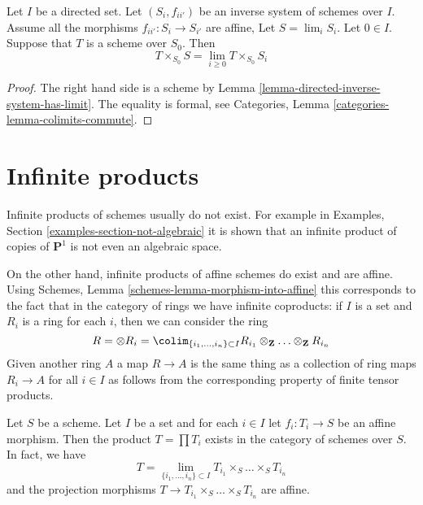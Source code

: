 \begin{lemma}
\label{lemma-scheme-over-limit}
Let $I$ be a directed set.
Let $(S_i, f_{ii'})$ be an inverse system of schemes over $I$.
Assume all the morphisms $f_{ii'} : S_i \to S_{i'}$ are affine,
Let $S = \lim_i S_i$. Let $0 \in I$.
Suppose that $T$ is a scheme over $S_0$.
Then
$$
T \times_{S_0} S = \lim_{i \geq 0} T \times_{S_0} S_i
$$
\end{lemma}

\begin{proof}
The right hand side is a scheme by
Lemma \ref{lemma-directed-inverse-system-has-limit}.
The equality is formal, see
Categories, Lemma \ref{categories-lemma-colimits-commute}.
\end{proof}



\section{Infinite products}
\label{section-inifinite-products}

\noindent
Infinite products of schemes usually do not exist. For example in
Examples, Section \ref{examples-section-not-algebraic}
it is shown that an infinite product of
copies of $\mathbf{P}^1$ is not even an algebraic space.

\medskip\noindent
On the other hand, infinite products of affine schemes do exist
and are affine. Using Schemes, Lemma \ref{schemes-lemma-morphism-into-affine}
this corresponds to the fact that in the category of rings
we have infinite coproducts: if $I$ is a set and $R_i$ is a ring
for each $i$, then we can consider the ring
$$
R = \otimes R_i =
\colim_{\{i_1, \ldots, i_n\} \subset I}
R_{i_1} \otimes_\mathbf{Z} \ldots \otimes_\mathbf{Z} R_{i_n}
$$
Given another ring $A$ a map $R \to A$ is the same thing as a
collection of ring maps $R_i \to A$ for all $i \in I$ as
follows from the corresponding property of finite tensor products.

\begin{lemma}
\label{lemma-infinite-product}
Let $S$ be a scheme. Let $I$ be a set and for each $i \in I$
let $f_i : T_i \to S$ be an affine morphism. Then the
product $T = \prod T_i$ exists in the category of schemes
over $S$. In fact, we have
$$
T = \lim_{\{i_1, \ldots, i_n\} \subset I}
T_{i_1} \times_S \ldots \times_S T_{i_n}
$$
and the projection morphisms $T \to T_{i_1} \times_S \ldots \times_S T_{i_n}$
are affine.
\end{lemma}

